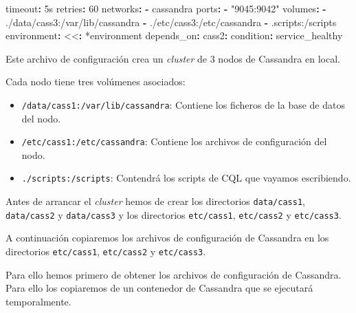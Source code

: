 \documentclass[
]{book}
\newenvironment{Shaded}{}{}
\newcommand{\AttributeTok}[1]{\textcolor[rgb]{0.49,0.56,0.16}{#1}}
\newcommand{\DecValTok}[1]{\textcolor[rgb]{0.25,0.63,0.44}{#1}}
\newcommand{\FunctionTok}[1]{\textcolor[rgb]{0.02,0.16,0.49}{#1}}
\newcommand{\KeywordTok}[1]{\textcolor[rgb]{0.00,0.44,0.13}{\textbf{#1}}}
\newcommand{\OtherTok}[1]{\textcolor[rgb]{0.00,0.44,0.13}{#1}}
\newcommand{\StringTok}[1]{\textcolor[rgb]{0.25,0.44,0.63}{#1}}
\providecommand{\tightlist}{%
  \setlength{\itemsep}{0pt}\setlength{\parskip}{0pt}}
\begin{document}
\begin{Shaded}
\begin{Highlighting}[]
\AttributeTok{      }\FunctionTok{timeout}\KeywordTok{:}\AttributeTok{ 5s}
\AttributeTok{      }\FunctionTok{retries}\KeywordTok{:}\AttributeTok{ }\DecValTok{60}
\AttributeTok{    }\FunctionTok{networks}\KeywordTok{:}
\AttributeTok{      }\KeywordTok{{-}}\AttributeTok{ cassandra}
\AttributeTok{    }\FunctionTok{ports}\KeywordTok{:}
\AttributeTok{      }\KeywordTok{{-}}\AttributeTok{ }\StringTok{"9045:9042"}
\AttributeTok{    }\FunctionTok{volumes}\KeywordTok{:}
\AttributeTok{      }\KeywordTok{{-}}\AttributeTok{ ./data/cass3:/var/lib/cassandra}
\AttributeTok{      }\KeywordTok{{-}}\AttributeTok{ ./etc/cass3:/etc/cassandra}
\AttributeTok{      }\KeywordTok{{-}}\AttributeTok{ .scripts:/scripts}
\AttributeTok{    }\FunctionTok{environment}\KeywordTok{:}
\AttributeTok{      }\FunctionTok{\textless{}\textless{}}\KeywordTok{:}\AttributeTok{ }\OtherTok{*environment}
\AttributeTok{    }\FunctionTok{depends\_on}\KeywordTok{:}
\AttributeTok{      }\FunctionTok{cass2}\KeywordTok{:}
\AttributeTok{        }\FunctionTok{condition}\KeywordTok{:}\AttributeTok{ service\_healthy}
\end{Highlighting}
\end{Shaded}

Este archivo de configuración crea un \emph{cluster} de 3 nodos de Cassandra en local.

Cada nodo tiene tres volúmenes asociados:

\begin{itemize}
\tightlist
\item
  \texttt{/data/cass1:/var/lib/cassandra}: Contiene los ficheros de la base de datos del nodo.
\item
  \texttt{/etc/cass1:/etc/cassandra}: Contiene los archivos de configuración del nodo.
\item
  \texttt{./scripts:/scripts}: Contendrá los scripts de CQL que vayamos escribiendo.
\end{itemize}

Antes de arrancar el \emph{cluster} hemos de crear los directorios \texttt{data/cass1}, \texttt{data/cass2} y \texttt{data/cass3} y los directorios \texttt{etc/cass1}, \texttt{etc/cass2} y \texttt{etc/cass3}.

A continuación copiaremos los archivos de configuración de Cassandra en los directorios \texttt{etc/cass1}, \texttt{etc/cass2} y \texttt{etc/cass3}.

Para ello hemos primero de obtener los archivos de configuración de Cassandra. Para ello los copiaremos de un contenedor de Cassandra que se ejecutará temporalmente.
\end{document}
